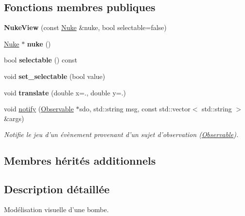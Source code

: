 \subsection*{Fonctions membres publiques}
\begin{DoxyCompactItemize}
\item 
\hypertarget{classNukeView_a9bb87e648efa96308058a68748e53a41}{{\bfseries Nuke\+View} (const \hyperlink{classNuke}{Nuke} \&nuke, bool selectable=false)}\label{classNukeView_a9bb87e648efa96308058a68748e53a41}

\item 
\hypertarget{classNukeView_a8bf8e524e5627138ed6c028cb4b87d2b}{\hyperlink{classNuke}{Nuke} $\ast$ {\bfseries nuke} ()}\label{classNukeView_a8bf8e524e5627138ed6c028cb4b87d2b}

\item 
\hypertarget{classNukeView_a70589619df5713cadcc47f399fae6e00}{bool {\bfseries selectable} () const }\label{classNukeView_a70589619df5713cadcc47f399fae6e00}

\item 
\hypertarget{classNukeView_ab3761858ebbe1f6dcde7813c4118bfd0}{void {\bfseries set\+\_\+selectable} (bool value)}\label{classNukeView_ab3761858ebbe1f6dcde7813c4118bfd0}

\item 
\hypertarget{classNukeView_aafe762f443b41b6ed69f488e8331d484}{void {\bfseries translate} (double x=., double y=.)}\label{classNukeView_aafe762f443b41b6ed69f488e8331d484}

\item 
void \hyperlink{classNukeView_a36c4aec5b90d0f4f95f3555f40bed6f3}{notify} (\hyperlink{classObservable}{Observable} $\ast$sdo, std\+::string msg, const std\+::vector$<$ std\+::string $>$ \&args)
\begin{DoxyCompactList}\small\item\em Notifie le jeu d'un évènement provenant d'un sujet d'observation (\hyperlink{classObservable}{Observable}). \end{DoxyCompactList}\end{DoxyCompactItemize}
\subsection*{Membres hérités additionnels}


\subsection{Description détaillée}
Modélisation visuelle d’une bombe. 

